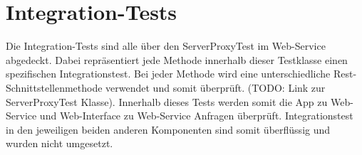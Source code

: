 \section{Integration-Tests}

Die Integration-Tests sind alle über den ServerProxyTest im Web-Service abgedeckt. Dabei repräsentiert jede Methode innerhalb dieser Testklasse einen spezifischen Integrationstest. Bei jeder Methode wird eine unterschiedliche Rest-Schnittstellenmethode verwendet und somit überprüft. (TODO: Link zur ServerProxyTest Klasse). Innerhalb dieses Tests werden somit die App zu Web-Service und Web-Interface zu Web-Service Anfragen überprüft. Integrationstest in den jeweiligen beiden anderen Komponenten sind somit überflüssig und wurden nicht umgesetzt.  